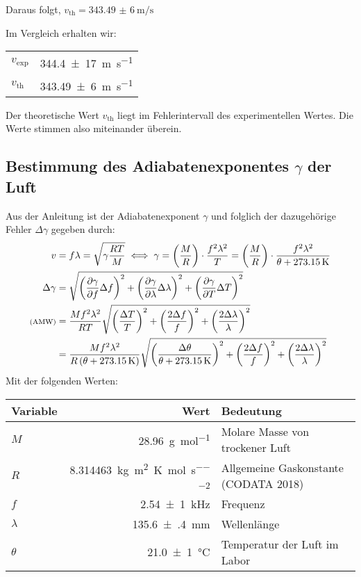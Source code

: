 		Daraus folgt, $v_\text{th} = \SI{343,49(6)}{\meter\per\second}$

		Im Vergleich erhalten wir:
		\begin{center}
	        \begin{tabular}{lr}
	            \toprule
	            $v_\text{exp}$ & \SI{344,4(17)}{\meter\per\second} \\
	            $v_\text{th}$ & \SI{343,49(6)}{\meter\per\second} \\
	            \bottomrule
	        \end{tabular}
	    \end{center}
	    Der theoretische Wert $v_\text{th}$ liegt im Fehlerintervall des experimentellen Wertes. Die Werte stimmen also miteinander überein.

	\subsection{Bestimmung des Adiabatenexponentes $\gamma$ der Luft}
		Aus der Anleitung ist der Adiabatenexponent $\gamma$ und folglich der dazugehörige Fehler $\Delta \gamma$ gegeben durch:
		\begin{align}
			v &= f \lambda = \sqrt{\gamma \frac{RT}{M}}  \iff \gamma = \pbrace{\frac{M}{R}}\cdot\frac{f^2\lambda^2}{T} = \pbrace{\frac{M}{R}}\cdot\frac{f^2\lambda^2}{\theta + \SI{273.15}{\kelvin}}  \\
			\Delta \gamma &= \gausserror{\gamma}{f, \lambda, T} \notag \\
			\text{\scriptsize (AMW)} &= \frac{Mf^2\lambda^2}{RT} \sqrt{\pbrace{\frac{\Delta T}{T}}^2 + \pbrace{\frac{2\Delta f}{f}}^2 + \pbrace{\frac{2\Delta \lambda}{\lambda}}^2} \notag \\
			&= \frac{Mf^2\lambda^2}{R\pbrace{\theta + \SI{273.15}{\kelvin}}} \sqrt{\pbrace{\frac{\Delta \theta}{\theta + \SI{273.15}{\kelvin}}}^2 + \pbrace{\frac{2\Delta f}{f}}^2 + \pbrace{\frac{2\Delta \lambda}{\lambda}}^2}
		\end{align}
		Mit der folgenden Werten:
	    \begin{center}
	        \begin{tabular}{lrl}
	            \toprule
	            Variable & Wert & Bedeutung \\
	            \midrule
	            $M$ & \SI{28,96}{\gram\per\mol} & Molare Masse von trockener Luft \\
	            $R$ & \SI{8.314463}{\kilo\gram\meter\squared\per\kelvin\per\mol\per\second\squared} & Allgemeine Gaskonstante (CODATA 2018) \\
	            $f$ & \SI{2,54(1)}{\kilo\hertz} & Frequenz \\
	            $\lambda$ & \SI{135.6(4)}{\milli\meter} & Wellenlänge \\
	            $\theta$ & \SI{21,0(1)}{\celsius} & Temperatur der Luft im Labor \\
	            \bottomrule
	        \end{tabular}
	    \end{center}
